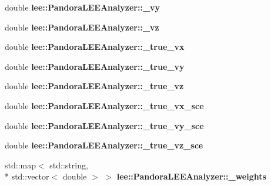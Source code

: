 \begin{DoxyCompactItemize}
\item 
\hypertarget{group__lee_gabbf5b67c1538e2771ba997ddd41c9341}{double {\bfseries lee\-::\-Pandora\-L\-E\-E\-Analyzer\-::\-\_\-vy}}\label{group__lee_gabbf5b67c1538e2771ba997ddd41c9341}

\item 
\hypertarget{group__lee_ga640cb654c98033c9294cb1fda9f86b89}{double {\bfseries lee\-::\-Pandora\-L\-E\-E\-Analyzer\-::\-\_\-vz}}\label{group__lee_ga640cb654c98033c9294cb1fda9f86b89}

\item 
\hypertarget{group__lee_ga537783c86380bbaf3357e3633f07ed7f}{double {\bfseries lee\-::\-Pandora\-L\-E\-E\-Analyzer\-::\-\_\-true\-\_\-vx}}\label{group__lee_ga537783c86380bbaf3357e3633f07ed7f}

\item 
\hypertarget{group__lee_gac8bd6c7a1c52045790f54232855c1073}{double {\bfseries lee\-::\-Pandora\-L\-E\-E\-Analyzer\-::\-\_\-true\-\_\-vy}}\label{group__lee_gac8bd6c7a1c52045790f54232855c1073}

\item 
\hypertarget{group__lee_gab2c80253d7af767bc7435a95b714d546}{double {\bfseries lee\-::\-Pandora\-L\-E\-E\-Analyzer\-::\-\_\-true\-\_\-vz}}\label{group__lee_gab2c80253d7af767bc7435a95b714d546}

\item 
\hypertarget{group__lee_ga8a638838ed9a1cde42fd00a198c3521b}{double {\bfseries lee\-::\-Pandora\-L\-E\-E\-Analyzer\-::\-\_\-true\-\_\-vx\-\_\-sce}}\label{group__lee_ga8a638838ed9a1cde42fd00a198c3521b}

\item 
\hypertarget{group__lee_ga1ea9a05e0b69aca1c22072cae8482b81}{double {\bfseries lee\-::\-Pandora\-L\-E\-E\-Analyzer\-::\-\_\-true\-\_\-vy\-\_\-sce}}\label{group__lee_ga1ea9a05e0b69aca1c22072cae8482b81}

\item 
\hypertarget{group__lee_ga5ac99bc027e85044950f2f502d3fffb0}{double {\bfseries lee\-::\-Pandora\-L\-E\-E\-Analyzer\-::\-\_\-true\-\_\-vz\-\_\-sce}}\label{group__lee_ga5ac99bc027e85044950f2f502d3fffb0}

\item 
\hypertarget{group__lee_ga114a52d8c3bfec336e931f1d4d8e6687}{std\-::map$<$ std\-::string, \\*
std\-::vector$<$ double $>$ $>$ {\bfseries lee\-::\-Pandora\-L\-E\-E\-Analyzer\-::\-\_\-weights}}\label{group__lee_ga114a52d8c3bfec336e931f1d4d8e6687}


\end{DoxyCompactItemize}

